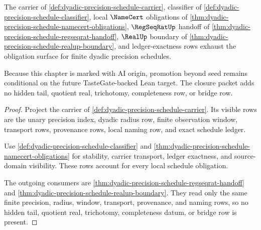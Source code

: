 \begin{theorem}
\label{thm:dyadicprecision-obligation-closure}
The carrier of \autoref{def:dyadic-precision-schedule-carrier}, classifier of
\autoref{def:dyadic-precision-schedule-classifier}, local $\NameCert$
obligations of
\autoref{thm:dyadic-precision-schedule-namecert-obligations}, $\RegSeqRatUp$
handoff of \autoref{thm:dyadic-precision-schedule-regseqrat-handoff},
$\RealUp$ boundary of
\autoref{thm:dyadic-precision-schedule-realup-boundary}, and ledger-exactness
rows exhaust the obligation surface for finite dyadic precision schedules.

Because this chapter is marked with AI origin, promotion beyond seed remains
conditional on the future TasteGate-backed Lean target. The closure packet adds
no hidden tail, quotient real, trichotomy, completeness row, or bridge row.
\end{theorem}
\begin{proof}
Project the carrier of
\autoref{def:dyadic-precision-schedule-carrier}. Its visible rows are the
unary precision index, dyadic radius row, finite observation window, transport
rows, provenance rows, local naming row, and exact schedule ledger.

Use \autoref{def:dyadic-precision-schedule-classifier} and
\autoref{thm:dyadic-precision-schedule-namecert-obligations} for stability,
carrier transport, ledger exactness, and source-domain visibility. These rows
account for every local schedule obligation.

The outgoing consumers are
\autoref{thm:dyadic-precision-schedule-regseqrat-handoff} and
\autoref{thm:dyadic-precision-schedule-realup-boundary}. They read only the
same finite precision, radius, window, transport, provenance, and naming rows,
so no hidden tail, quotient real, trichotomy, completeness datum, or bridge row
is present.
\end{proof}

